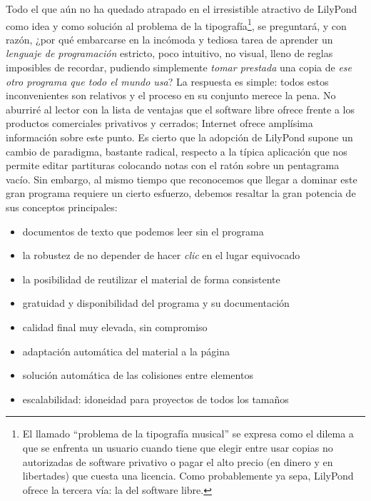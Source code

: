 Todo el que aún no ha quedado atrapado en el irresistible atractivo de
LilyPond como idea y como solución al problema de la
tipografía\footnote{El llamado ``problema de la tipografía musical''
  se expresa como el dilema a que se enfrenta un usuario cuando tiene
  que elegir entre usar copias no autorizadas de software privativo o
  pagar el alto precio (en dinero y en libertades) que cuesta una
  licencia. Como probablemente ya sepa, LilyPond ofrece la tercera
  vía: la del software libre.}, se preguntará, y con razón, ¿por qué
embarcarse en la incómoda y tediosa tarea de aprender un
\emph{lenguaje de programación} estricto, poco intuitivo, no visual,
lleno de reglas imposibles de recordar, pudiendo simplemente
\emph{tomar prestada} una copia de \emph{ese otro programa que todo el
  mundo usa}? La respuesta es simple: todos estos inconvenientes son
relativos y el proceso en su conjunto merece la pena.  No aburriré al
lector con la lista de ventajas que el software libre ofrece frente a
los productos comerciales privativos y cerrados; Internet ofrece
amplísima información sobre este punto.  Es cierto que la adopción de
LilyPond supone un cambio de paradigma, bastante radical, respecto a
la típica aplicación que nos permite editar partituras colocando notas
con el ratón sobre un pentagrama vacío. Sin embargo, al mismo tiempo
que reconocemos que llegar a dominar este gran programa requiere un
cierto esfuerzo, debemos resaltar la gran potencia de sus conceptos
principales:

\begin{itemize}
\item documentos de texto que podemos leer sin el programa
\item la robustez de no depender de hacer \emph{clic} en el lugar equivocado
\item la posibilidad de reutilizar el material de forma consistente
\item gratuidad y disponibilidad del programa y su documentación
\item calidad final muy elevada, sin compromiso
\item adaptación automática del material a la página
\item solución automática de las colisiones entre elementos
\item escalabilidad: idoneidad para proyectos de todos los tamaños
\end{itemize}


